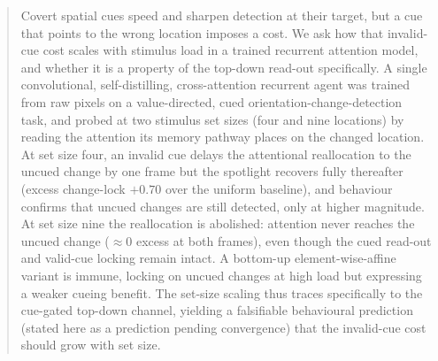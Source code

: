 \begin{abstract}
Covert spatial cues speed and sharpen detection at their target, but a cue that points to the wrong location imposes a cost. We ask how that invalid-cue cost scales with stimulus load in a trained recurrent attention model, and whether it is a property of the top-down read-out specifically. A single convolutional, self-distilling, cross-attention recurrent agent was trained from raw pixels on a value-directed, cued orientation-change-detection task, and probed at two stimulus set sizes (four and nine locations) by reading the attention its memory pathway places on the changed location. At set size four, an invalid cue delays the attentional reallocation to the uncued change by one frame but the spotlight recovers fully thereafter (excess change-lock $+0.70$ over the uniform baseline), and behaviour confirms that uncued changes are still detected, only at higher magnitude. At set size nine the reallocation is abolished: attention never reaches the uncued change ($\approx 0$ excess at both frames), even though the cued read-out and valid-cue locking remain intact. A bottom-up element-wise-affine variant is immune, locking on uncued changes at high load but expressing a weaker cueing benefit. The set-size scaling thus traces specifically to the cue-gated top-down channel, yielding a falsifiable behavioural prediction (stated here as a prediction pending convergence) that the invalid-cue cost should grow with set size.
\end{abstract}
